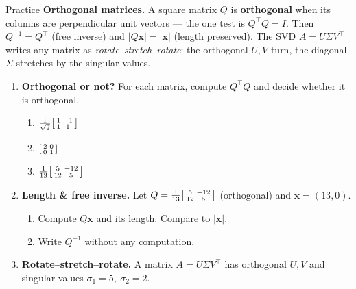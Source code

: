 \documentclass[10pt]{article}
\newcommand{\xx}{\mathbf{x}}
\newcommand{\T}{^{\top}}
\begin{document}
\namedateperiod

\vspace{0.12in}

\begin{notesbox}{Practice}
\textbf{Orthogonal matrices.} A square matrix $Q$ is \textbf{orthogonal} when its columns are perpendicular unit
vectors --- the one test is $Q\T Q=I$. Then $Q^{-1}=Q\T$ (free inverse) and $|Q\xx|=|\xx|$ (length preserved).
The SVD $A=U\Sigma V\T$ writes any matrix as \emph{rotate--stretch--rotate}: the orthogonal $U,V$ turn, the
diagonal $\Sigma$ stretches by the singular values.

\begin{enumerate}[leftmargin=1.9em, itemsep=12pt]
  \item \textbf{Orthogonal or not?} For each matrix, compute $Q\T Q$ and decide whether it is orthogonal.
    \begin{enumerate}[label=(\alph*), leftmargin=1.8em, itemsep=3pt]
      \item $\tfrac1{\sqrt2}\begin{bsmallmatrix} 1 & -1\\ 1 & 1 \end{bsmallmatrix}$
      \item $\begin{bsmallmatrix} 2 & 0\\ 0 & 1 \end{bsmallmatrix}$
      \item $\tfrac1{13}\begin{bsmallmatrix} 5 & -12\\ 12 & 5 \end{bsmallmatrix}$
    \end{enumerate}
    \vspace{2.2cm}
  \item \textbf{Length \& free inverse.} Let $Q=\tfrac1{13}\begin{bsmallmatrix} 5 & -12\\ 12 & 5 \end{bsmallmatrix}$ (orthogonal) and $\xx=(13,0)$.
    \begin{enumerate}[label=(\alph*), leftmargin=1.8em, itemsep=3pt]
      \item Compute $Q\xx$ and its length. Compare to $|\xx|$.
      \item Write $Q^{-1}$ without any computation.
    \end{enumerate}
    \vspace{2.0cm}
  \item \textbf{Rotate--stretch--rotate.} A matrix $A=U\Sigma V\T$ has orthogonal $U,V$ and singular values $\sigma_1=5,\ \sigma_2=2$.

\end{enumerate}
\end{notesbox}
\end{document}
